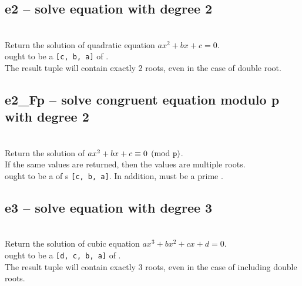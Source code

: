   \subsection{e2 -- solve equation with degree 2}
   \\
   \spacing
   \quad Return the solution of quadratic equation $ax^2 + bx + c = 0$.\\
   \spacing
   \quad {} ought to be a  {\tt [c, b, a]} of . \\
   The result tuple will contain exactly 2 roots, even in the case of
   double root.\\
%
  \subsection{e2\_Fp -- solve congruent equation modulo p with degree 2}
   \\
   \spacing
   \quad Return the solution of $ax^2 + bx + c  \equiv 0 \pmod{{\texttt p}}$.\\
   \spacing
   \quad If the same values are returned, then the values are multiple roots. \\
   \spacing
   \quad {} ought to be a  of 
   s {\tt [c, b, a]}.
   In addition,  must be a prime . \\
%
  \subsection{e3 -- solve equation with degree 3}
   \\
   \spacing
   \quad Return the solution of cubic equation $ax^3 + bx^2 + cx + d = 0$.\\
   \spacing
   \quad {} ought to be a  {\tt [d, c, b, a]} of . \\
   The result tuple will contain exactly 3 roots, even in the case of including
   double roots.\\
%
